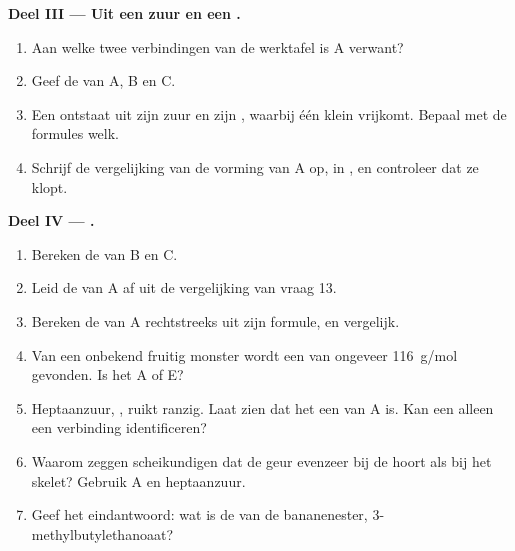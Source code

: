 \begin{problem}
\medskip
\noindent\textbf{Deel III --- Uit een zuur en een .}
\begin{enumerate}[resume]
  \item Aan welke twee verbindingen van de werktafel is A verwant?
  \item Geef de  van A, B en C.
  \item Een  ontstaat uit zijn zuur en zijn , waarbij één
        klein  vrijkomt. Bepaal met de formules welk.
  \item Schrijf de vergelijking van de vorming van A op, in
        , en controleer dat ze klopt.
\end{enumerate}

\medskip
\noindent\textbf{Deel IV --- .}
\begin{enumerate}[resume]
  \item Bereken de  van B en C.
  \item Leid de  van A af uit de vergelijking van vraag 13.
  \item Bereken de  van A rechtstreeks uit zijn formule, en
        vergelijk.
  \item Van een onbekend fruitig monster wordt een  van
        ongeveer \qty{116}{g/mol} gevonden. Is het A of E?
  \item Heptaanzuur, , ruikt ranzig. Laat zien dat het
        een  van A is. Kan een  alleen een verbinding
        identificeren?
  \item Waarom zeggen scheikundigen dat de geur evenzeer bij de
         hoort als bij het skelet? Gebruik A en
        heptaanzuur.
  \item Geef het eindantwoord: wat is de  van de bananenester,
        3-methylbutylethanoaat?
\end{enumerate}
\end{problem}
